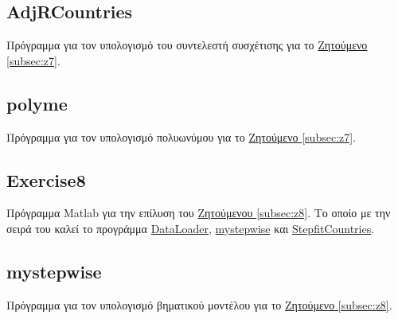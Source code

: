 \documentclass[11pt]{scrartcl} %
\begin{document}
\subsection{AdjRCountries}
\label{prog:AdjRCountries}
Πρόγραμμα για τον υπολογισμό του συντελεστή συσχέτισης για το \hyperref[subsec:z7]{Ζητούμενο \ref*{subsec:z7}}.
	
	
	
	
\subsection{polyme}
\label{prog:polyme}
Πρόγραμμα για τον υπολογισμό πολυωνύμου για το \hyperref[subsec:z7]{Ζητούμενο \ref*{subsec:z7}}.
	
	
	
	
\subsection{Exercise8}
\label{prog:8}
Πρόγραμμα Matlab για την επίλυση του \hyperref[subsec:z8]{Ζητούμενου \ref*{subsec:z8}}. Το οποίο με την σειρά του καλεί το προγράμμα \hyperref[prog:DataLoader]{DataLoader}, \hyperref[prog:mystepwise]{mystepwise} και \hyperref[prog:StepfitCountries]{StepfitCountries}.


\subsection{mystepwise}
\label{prog:mystepwise}
Πρόγραμμα για τον υπολογισμό βηματικού μοντέλου για το \hyperref[subsec:z8]{Ζητούμενο \ref*{subsec:z8}}.
	
	
\end{document}
